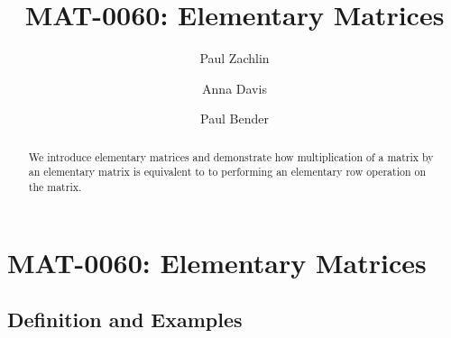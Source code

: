 \documentclass{ximera}
\author{Paul Zachlin \and Anna Davis \and Paul Bender} \title{MAT-0060: Elementary Matrices} \license{CC-BY 4.0}
\begin{document}
\begin{abstract}
 We introduce elementary matrices and demonstrate how multiplication of a matrix by an elementary matrix is equivalent to to performing an elementary row operation on the matrix.
\end{abstract}
\maketitle

\section*{MAT-0060: Elementary Matrices}
\subsection*{Definition and Examples}
\end{document}
